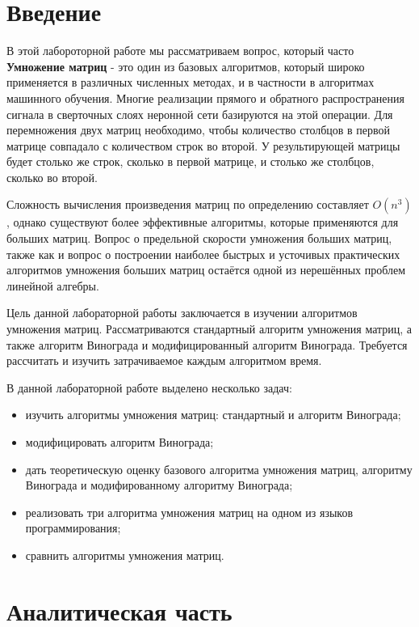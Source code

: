 \documentclass[12pt,a4paper]{report}
\begin{document}

\tableofcontents

\newpage
\chapter*{Введение}
В этой лабороторной работе мы рассматриваем вопрос, который часто
\textbf{Умножение матриц} - это один из базовых алгоритмов, который широко применяется в различных численных 
методах, и в частности в алгоритмах машинного обучения. 
Многие реализации прямого и обратного распространения сигнала в сверточных слоях неронной сети базируются на 
этой операции. Для перемножения двух матриц необходимо, чтобы количество столбцов в первой матрице совпадало 
с количеством строк во второй. У результирующей матрицы будет столько же строк, сколько в первой матрице, и 
столько же столбцов, сколько во второй. 

Сложность вычисления произведения матриц по определению составляет $O(n^3)$, однако существуют более эффективные 
алгоритмы, которые применяются для больших матриц. 
Вопрос о предельной скорости умножения больших матриц, также как и вопрос о построении наиболее быстрых и усточивых 
практических алгоритмов умножения больших матриц остаётся одной из нерешённых проблем линейной алгебры.

Цель данной лабораторной работы заключается в изучении алгоритмов умножения матриц.
Рассматриваются стандартный алгоритм умножения матриц, а также алгоритм Винограда и модифицированный алгоритм 
Винограда.
Требуется рассчитать и изучить затрачиваемое каждым алгоритмом время. 

В данной лабораторной работе выделено несколько задач:
\begin{itemize}
	\item изучить алгоритмы умножения матриц: стандартный и алгоритм Винограда;
	\item модифицировать алгоритм Винограда;
	\item дать теоретическую оценку базового алгоритма умножения матриц, алгоритму Винограда и модифированному алгоритму Винограда;
	\item реализовать три алгоритма умножения матриц на одном из языков программирования;
	\item сравнить алгоритмы умножения матриц.
\end{itemize}

\newpage
\chapter{Аналитическая часть}
\end{document}
